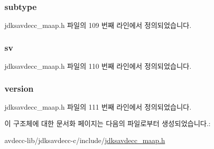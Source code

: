 \subsubsection[{\texorpdfstring{subtype}{subtype}}]{ subtype}\hypertarget{structjdksavdecc__maap__common__control__header_aed06f4a516930ca81d204d53c61a1ef3}{}\label{structjdksavdecc__maap__common__control__header_aed06f4a516930ca81d204d53c61a1ef3}


jdksavdecc\+\_\+maap.\+h 파일의 109 번째 라인에서 정의되었습니다.

\subsubsection[{\texorpdfstring{sv}{sv}}]{ sv}\hypertarget{structjdksavdecc__maap__common__control__header_a9eeedef9f348218323834a3cf44d64c4}{}\label{structjdksavdecc__maap__common__control__header_a9eeedef9f348218323834a3cf44d64c4}


jdksavdecc\+\_\+maap.\+h 파일의 110 번째 라인에서 정의되었습니다.

\subsubsection[{\texorpdfstring{version}{version}}]{ version}\hypertarget{structjdksavdecc__maap__common__control__header_acd99bb05ca015e7d74448acb1deba7ca}{}\label{structjdksavdecc__maap__common__control__header_acd99bb05ca015e7d74448acb1deba7ca}


jdksavdecc\+\_\+maap.\+h 파일의 111 번째 라인에서 정의되었습니다.



이 구조체에 대한 문서화 페이지는 다음의 파일로부터 생성되었습니다.\+:\begin{DoxyCompactItemize}
\item 
avdecc-\/lib/jdksavdecc-\/c/include/\hyperlink{jdksavdecc__maap_8h}{jdksavdecc\+\_\+maap.\+h}\end{DoxyCompactItemize}
